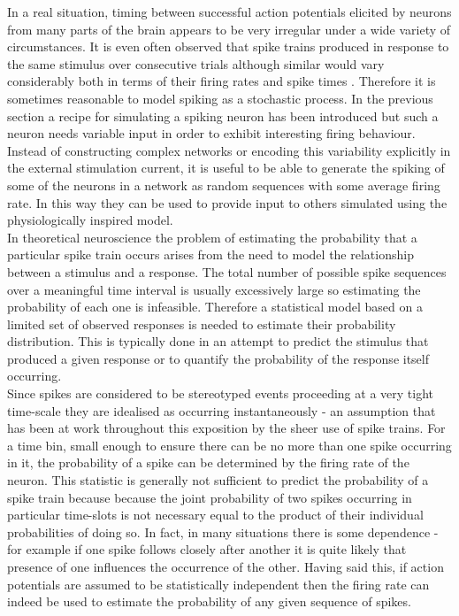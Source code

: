 \documentclass[12pt]{extarticle}
\begin{document}
In a real situation, timing between successful action potentials
elicited by neurons from many parts of the brain appears to be very
irregular under a wide variety of circumstances. It is even often
observed that spike trains produced in response to the same stimulus
over consecutive trials although similar would vary considerably both
in terms of their firing rates and spike times \cite{Dyan-Abbott}. Therefore it
is sometimes reasonable to model spiking as a stochastic process. In
the previous section a recipe for simulating a spiking neuron has been
introduced but such a neuron needs variable input in order to exhibit
interesting firing behaviour. Instead of constructing complex networks
or encoding this variability explicitly in the external stimulation
current, it is useful to be able to generate the spiking of some of
the neurons in a network as random sequences with some average firing
rate. In this way they can be used to provide input to others
simulated using the physiologically inspired model.\\

\noindent
In theoretical neuroscience the problem of estimating the probability
that a particular spike train occurs arises from the need to model the
relationship between a stimulus and a response. The total number of
possible spike sequences over a meaningful time interval is usually
excessively large so estimating the probability of each one is
infeasible. Therefore a statistical model based on a limited set of
observed responses is needed to estimate their probability
distribution. This is typically done in an attempt to predict the
stimulus that produced a given response or to quantify the probability
of the response itself occurring.\\

\noindent
Since spikes are considered to be stereotyped events proceeding at a
very tight time-scale they are idealised as occurring instantaneously
- an assumption that has been at work throughout this exposition by
the sheer use of spike trains. For a time bin, small enough to ensure
there can be no more than one spike occurring in it, the probability
of a spike can be determined by the firing rate of the neuron. This
statistic is generally not sufficient to predict the probability of a
spike train because because the joint probability of two spikes
occurring in particular time-slots is not necessary equal to the
product of their individual probabilities of doing so. In fact, in
many situations there is some dependence - for example if one spike
follows closely after another it is quite likely that presence of one
influences the occurrence of the other. Having said this, if action
potentials are assumed to be statistically independent then the firing
rate can indeed be used to estimate the probability of any given
sequence of spikes.\\
\end{document}

